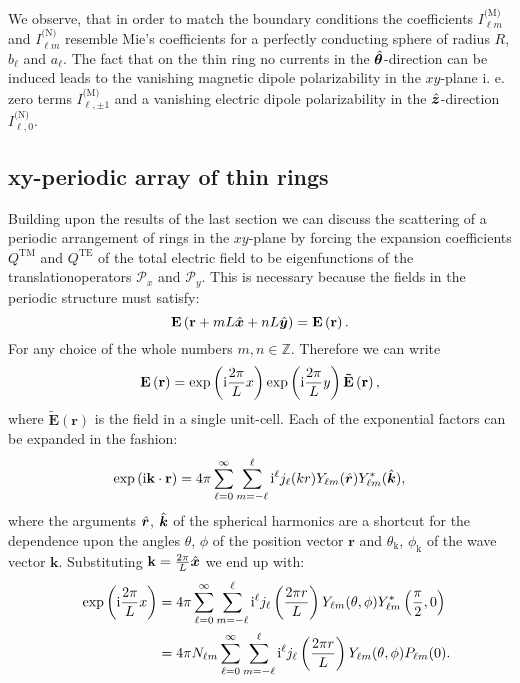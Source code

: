 We observe, that in order to match the boundary conditions the coefficients $I_{\ell m}^\text{(M)}$ and $I_{\ell m}^\text{(N)}$ resemble Mie's coefficients for a perfectly conducting sphere of radius $R$, $b_\ell$ and $a_\ell$. 
The fact that on the thin ring no currents in the $\hat{\bm{\theta}}$-direction can be induced leads to the vanishing magnetic dipole polarizability in the $xy$-plane i. e. zero terms $I_{\ell, \pm 1}^\text{(M)}$ and a vanishing electric dipole polarizability in the $\hat{\bm{z}}$-direction $I_{\ell, 0}^\text{(N)}$.

\subsection{xy-periodic array of thin rings}
Building upon the results of the last section we can discuss the scattering of a periodic arrangement of rings in the $xy$-plane by forcing the expansion coefficients $Q^\text{TM}$ and $Q^\text{TE}$ of the total electric field to be eigenfunctions of the translationoperators $\mathcal{P}_x$ and $\mathcal{P}_y$. This is necessary because the fields in the periodic structure must satisfy:
\begin{equation}
\mathbf{E}\left(\mathbf{r}+m L \hat{\bm{x}}+
n L \hat{\bm{y}}\right)=
\mathbf{E}\left(\mathbf{r}\right).
\end{equation}
For any choice of the whole numbers $m, n\in \mathbb{Z}$. Therefore we can write
\begin{equation}
\mathbf{E}\left(\mathbf{r}\right) = 
\exp\left(\mathrm{i} \frac{2\pi}{L}x\right) \exp\left(\mathrm{i} \frac{2\pi}{L}y\right)\mathbf{\tilde{E}}\left(\mathbf{r}\right),
\end{equation}
where $\mathbf{\tilde{E}}(\mathbf{r})$ is the field in a single unit-cell. Each of the exponential factors can be expanded in the fashion:
\begin{equation}
\exp\left(\mathrm{i}\mathbf{k}\cdot \mathbf{r}\right) = 4\pi \sum_{\ell=0}^\infty \sum_{m=-\ell}^\ell
\mathrm{i}^\ell j_\ell(kr) Y_{\ell m}(\hat{\bm{r}}) Y_{\ell m}^*(\hat{\bm{k}}),
\end{equation}
where the arguments $\hat{\bm{r}}$, $\hat{\bm{k}}$ of the spherical harmonics are a shortcut for the dependence upon the angles $\theta$, $\phi$ of the position vector $\mathbf{r}$ and $\theta_\mathrm{k}$, $\phi_\mathrm{k}$ of the wave vector $\mathbf{k}$. Substituting $\mathbf{k}=\frac{2\pi}{L}\hat{\bm{x}}$ we end up with:
\begin{align}
&& \nonumber
\exp\left(\mathrm{i} \frac{2\pi}{L} x\right) &= 4\pi \sum_{\ell=0}^\infty \sum_{m=-\ell}^\ell
\mathrm{i}^\ell j_\ell\left(\frac{2\pi r}{L}\right) Y_{\ell m}(\theta, \phi) Y_{\ell m}^*\left(\frac{\pi}{2}, 0\right) \\
&& &= 4\pi N_{\ell m} \sum_{\ell=0}^\infty \sum_{m=-\ell}^\ell
\mathrm{i}^\ell j_\ell\left(\frac{2\pi r}{L}\right) Y_{\ell m}(\theta, \phi)
P_{\ell m}(0).
\label{eqn:xperiodicity}
\end{align}
